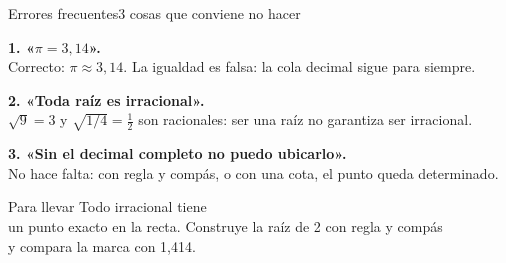 \documentclass[12pt]{article}
\begin{document}
\begin{mwmodlamina}[mwrojonaranja]{Errores frecuentes}{3 cosas que conviene no hacer}
\begin{mwcajaalerta}
  {\textbf{1. «$\pi=3{,}14$».} \;\mwcmal\\[2pt]
  {\mwsmall Correcto: $\pi\approx3{,}14$. La igualdad es falsa:
  la cola decimal sigue para siempre.}}
\end{mwcajaalerta}

\begin{mwcajaalerta}
  {\textbf{2. «Toda raíz es irracional».} \;\mwcmal\\[2pt]
  {\mwsmall $\sqrt9=3$ y $\sqrt{1/4}=\frac12$ son racionales: ser
  una raíz no garantiza ser irracional.}}
\end{mwcajaalerta}

\begin{mwcajaalerta}
  {\textbf{3. «Sin el decimal completo no puedo ubicarlo».}
  \;\mwcmal\\[2pt]
  {\mwsmall No hace falta: con regla y compás, o con una cota, el
  punto queda determinado.}}
\end{mwcajaalerta}
\end{mwmodlamina}

\mwmodfin
  {Para llevar}
  {Todo irracional tiene\\
   un punto exacto en la recta.}
  {Construye la raíz de 2 con regla y compás\\
   y compara la marca con 1,414.}
\end{document}
